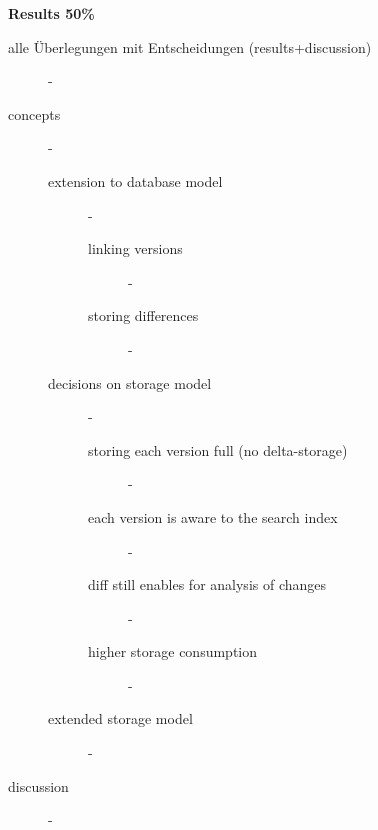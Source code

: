 

\textbf{ Results 50\%}
\begin{description}
  \item[alle Überlegungen mit Entscheidungen (results+discussion)] - 
  \item[concepts] - 
  \begin{description}
    \item[extension to database model] - 
    \begin{description}
      \item[linking versions] - 
      \item[storing differences] - 
    \end{description} %
    \item[decisions on storage model] - 
    \begin{description}
      \item[storing each version full (no delta-storage)] - 
      \item[each version is aware to the search index] - 
      \item[diff still enables for analysis of changes] - 
      \item[higher storage consumption] - 
    \end{description} %
    \item[extended storage model] - 
  \end{description} %
  \item[discussion] - 
\end{description} %

